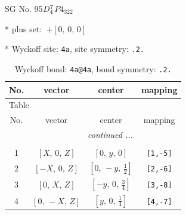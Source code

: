 \documentclass[fleqn,8pt]{jsarticle}
\begin{document}
\setcounter{MaxMatrixCols}{32}

\renewcommand{\tablename}{Table~}
\renewcommand{\figurename}{Figure~}
\begin{center}
\LARGE
SG No. 95\quad$D_{\rm 4}^{7}$\quad$P4_322$\quad[ tetragonal ]
\end{center}

* plus set:\,\,\,$+\left[ 0,\, 0,\, 0 \right]$


* Wyckoff site: {\tt 4a}, site symmetry: {\tt .2.}
\renewcommand{\arraystretch}{1.2}
\begin{longtable}{cccc}
\caption{Wyckoff bond: {\tt 4a@4a}, bond symmetry: {\tt .2.}}
 \\
 \hline \hline
No. & vector & center & mapping \\ \hline \endfirsthead

\multicolumn{3}{l}{\tablename\ \thetable{}} \\
 \hline \hline
No. & vector & center & mapping \\ \hline \endhead

 \hline \hline
\multicolumn{3}{r}{\footnotesize\it continued ...} \\ \endfoot

 \hline \hline
\multicolumn{3}{r}{} \\ \endlastfoot

1 & $\left[ X,\, 0,\, Z \right]$ & $\left[ 0,\, y,\, 0 \right]$ & {\tt [1,-5]} \\ \hline
2 & $\left[ - X,\, 0,\, Z \right]$ & $\left[ 0,\, - y,\, \frac{1}{2} \right]$ & {\tt [2,-6]} \\ \hline
3 & $\left[ 0,\, X,\, Z \right]$ & $\left[ - y,\, 0,\, \frac{3}{4} \right]$ & {\tt [3,-8]} \\ \hline
4 & $\left[ 0,\, - X,\, Z \right]$ & $\left[ y,\, 0,\, \frac{1}{4} \right]$ & {\tt [4,-7]} \\
\end{longtable}
\renewcommand{\arraystretch}{1.2}
\end{document}
